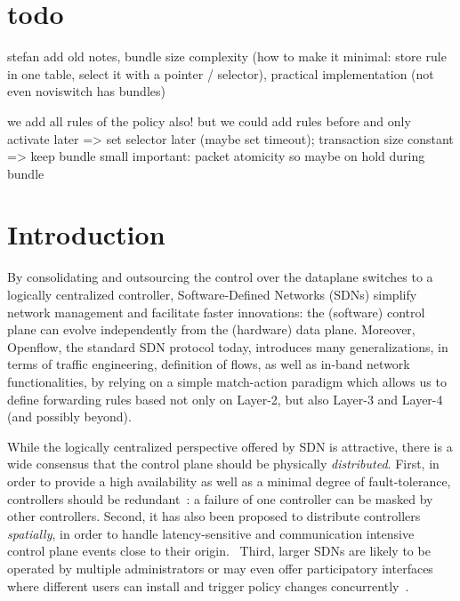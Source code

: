 \documentclass[conference]{sigcomm-alternate}
\begin{document}


\section*{todo}

stefan add old notes, bundle size complexity (how to make it minimal: store rule in one table, select it with a pointer / selector),
practical implementation (not even noviswitch has bundles)

we add all rules of the policy also! but we could add rules before and only activate later => set selector later (maybe set timeout); transaction size constant => keep bundle small important: packet atomicity so maybe on hold during bundle



\section{Introduction}\label{sec:intro}

By consolidating and outsourcing the control over the dataplane switches to a logically
centralized controller, Software-Defined Networks (SDNs)
simplify network management and facilitate faster innovations:
the (software) control plane can evolve independently from the
(hardware) data plane.
Moreover, Openflow, the standard SDN protocol today, introduces many generalizations,
in terms of traffic engineering, definition of flows, as well as in-band network functionalities,
by relying on a simple match-action paradigm which allows us to define
forwarding rules based not only on Layer-2, but also Layer-3 and Layer-4 (and possibly beyond).

While the logically centralized perspective offered by SDN is attractive,
there is a wide consensus that
the control plane should be physically \emph{distributed}.
First, in order to provide a high availability as well as a minimal degree of
fault-tolerance, controllers should be redundant~\cite{onix,stn,onos}: a failure
of one controller can be masked by other controllers. Second, it has also been proposed
to distribute controllers \emph{spatially}, in order to handle latency-sensitive and
communication intensive control plane events close to their origin.~\cite{devoflow,kandoo,jukka,disco}
Third, larger SDNs are likely to be operated by multiple administrators or may even offer
participatory interfaces where different users can install and trigger policy changes
concurrently~\cite{participatory,stn}.
\end{document}
